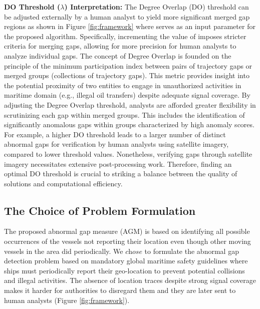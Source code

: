 \documentclass[acmsmall]{acmart}
\begin{document}
\textbf{DO Threshold ($\lambda$) Interpretation:} The Degree Overlap (DO) threshold can be adjusted externally by a human analyst to yield more significant merged gap regions as shown in Figure \ref{fig:framework} where  serves as an input parameter for the proposed algorithm. Specifically, incrementing the value of imposes stricter criteria for merging gaps, allowing for more precision for human analysts to analyze individual gaps. The concept of Degree Overlap is founded on the principle of the minimum participation index between pairs of trajectory gaps or merged groups (collections of trajectory gaps). This metric provides insight into the potential proximity of two entities to engage in unauthorized activities in maritime domain (e.g., illegal oil transfers) despite adequate signal coverage. By adjusting the Degree Overlap threshold, analysts are afforded greater flexibility in scrutinizing each gap within merged groups. This includes the identification of significantly anomalous gaps within groups characterized by high anomaly scores. For example, a higher DO threshold  leads to a larger number of distinct abnormal gaps for verification by human analysts using satellite imagery, compared to lower threshold values. Nonetheless, verifying gaps through satellite imagery necessitates extensive post-processing work. Therefore, finding an optimal DO threshold is crucial to striking a balance between the quality of solutions and computational efficiency.

\subsection{The Choice of Problem Formulation}
\label{subsection:ChoiceProblemstatement}

The proposed abnormal gap measure (AGM) is based on identifying all possible occurrences of the vessels not reporting their location even though other moving vessels in the area did periodically. We $\textit{chose}$ to formulate the abnormal gap detection problem based on mandatory global maritime safety guidelines where ships must periodically report their geo-location to prevent potential collisions and illegal activities. The absence of location traces despite strong signal coverage makes it harder for authorities to disregard them and they are later sent to human analysts (Figure \ref{fig:framework}). 
\end{document}
